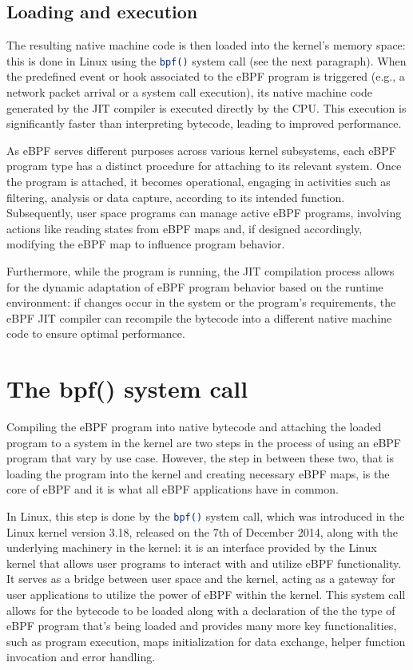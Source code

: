 \subsection{Loading and execution}

The resulting native machine code is then loaded into the kernel's memory space: this is done in Linux using the \colorbox{backcolour}{\lstinline[style=commandline, language=bash, breaklines=true]|bpf()|} system call (see the next paragraph).
When the predefined event or hook associated to the eBPF program is triggered (e.g., a network packet arrival or a system call execution), its native machine code generated by the JIT compiler is executed directly by the CPU. 
This execution is significantly faster than interpreting bytecode, leading to improved performance.

As eBPF serves different purposes across various kernel subsystems, each eBPF program type has a distinct procedure for attaching to its relevant system. 
Once the program is attached, it becomes operational, engaging in activities such as filtering, analysis or data capture, according to its intended function. 
Subsequently, user space programs can manage active eBPF programs, involving actions like reading states from eBPF maps and, if designed accordingly, modifying the eBPF map to influence program behavior.

Furthermore, while the program is running, the JIT compilation process allows for the dynamic adaptation of eBPF program behavior based on the runtime environment: if changes occur in the system or the program's requirements, the eBPF JIT compiler can recompile the bytecode into a different native machine code to ensure optimal performance.

\section{The bpf() system call}

Compiling the eBPF program into native bytecode and attaching the loaded program to a system in the kernel are two steps in the process of using an eBPF program that vary by use case.
However, the step in between these two, that is loading the program into the kernel and creating necessary eBPF maps, is the core of eBPF and it is what all eBPF applications have in common.

In Linux, this step is done by the \colorbox{backcolour}{\lstinline[style=commandline, language=bash, breaklines=true]|bpf()|} system call, which was introduced in the Linux kernel version 3.18, released on the 7th of December 2014, along with the underlying machinery in the kernel: it is an interface provided by the Linux kernel that allows user programs to interact with and utilize eBPF functionality. 
It serves as a bridge between user space and the kernel, acting as a gateway for user applications to utilize the power of eBPF within the kernel.
This system call allows for the bytecode to be loaded along with a declaration of the the type of eBPF program that’s being loaded and provides many more key functionalities, such as program execution, maps initialization for data exchange, helper function invocation and error handling.

